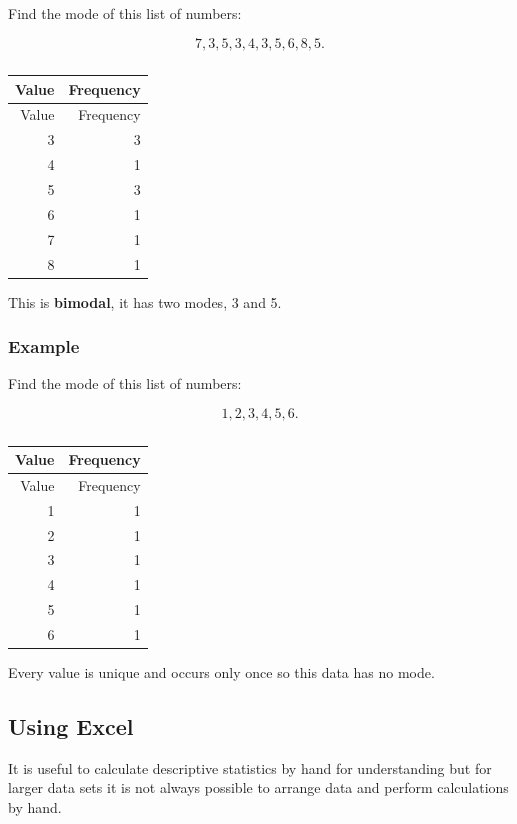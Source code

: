 \documentclass[
]{book}
\begin{document}
Find the mode of this list of numbers:

\[ 7, 3, 5, 3, 4, 3, 5, 6, 8, 5.\]

\begin{longtable}[]{@{}rr@{}}
\caption{\label{tab:table6}}\tabularnewline
\toprule
Value & Frequency \\
\midrule
\endfirsthead
\toprule
Value & Frequency \\
\midrule
\endhead
3 & 3 \\
4 & 1 \\
5 & 3 \\
6 & 1 \\
7 & 1 \\
8 & 1 \\
\bottomrule
\end{longtable}

This is \textbf{bimodal}, it has two modes, 3 and 5.

\hypertarget{example-5}{%
\subsubsection{Example}\label{example-5}}

Find the mode of this list of numbers:

\[ 1, 2, 3, 4, 5, 6.\]

\begin{longtable}[]{@{}rr@{}}
\caption{\label{tab:table7}}\tabularnewline
\toprule
Value & Frequency \\
\midrule
\endfirsthead
\toprule
Value & Frequency \\
\midrule
\endhead
1 & 1 \\
2 & 1 \\
3 & 1 \\
4 & 1 \\
5 & 1 \\
6 & 1 \\
\bottomrule
\end{longtable}

Every value is unique and occurs only once so this data has no mode.

\hypertarget{using-excel}{%
\subsection{Using Excel}\label{using-excel}}

It is useful to calculate descriptive statistics by hand for understanding but for larger data sets it is not always possible to arrange data and perform calculations by hand.
\end{document}
